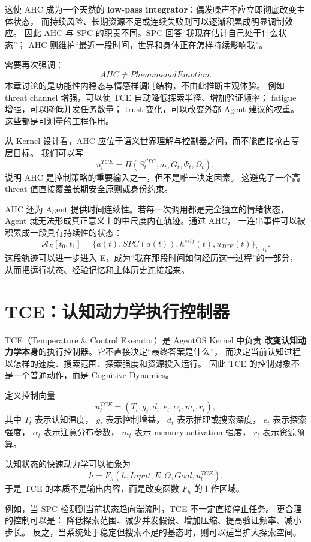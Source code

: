 这使 AHC 成为一个天然的
\textbf{low-pass integrator}：偶发噪声不应立即彻底改变主体状态，
而持续风险、长期资源不足或连续失败则可以逐渐积累成明显调制效应。
因此 AHC 与 SPC 的职责不同。SPC 回答``我现在估计自己处于什么状态''；
AHC 则维护``最近一段时间，世界和身体正在怎样持续影响我''。

需要再次强调：
\[
\boxed{
AHC\neq PhenomenalEmotion.
}
\]
本章讨论的是功能性内稳态与情感样调制结构，不由此推断主观体验。
例如 threat channel 增强，可以使 TCE 自动降低探索半径、增加验证频率；
fatigue 增强，可以降低并发任务数量；
trust 变化，可以改变外部 Agent 建议的权重。
这些都是可测量的工程作用。

从 Kernel 设计看，AHC 应位于语义世界理解与控制器之间，而不能直接抢占高层目标。
我们可以写
\[
u_t^{TCE}
=
\Pi(
S_t^{SPC},
a_t,
G_t,
\Psi_t,
\Omega_t
),
\]
说明 AHC 是控制策略的重要输入之一，但不是唯一决定因素。
这避免了一个高 threat 值直接覆盖长期安全原则或身份约束。

AHC 还为 Agent 提供时间连续性。若每一次调用都是完全独立的情绪状态，
Agent 就无法形成真正意义上的中尺度内在轨迹。通过 AHC，
一连串事件可以被积累成一段具有持续性的状态：
\[
\mathcal A_E[t_0,t_1]
=
\{a(t),SPC(a(t)),h^{self}(t),u_{TCE}(t)\}_{t_0:t_1}.
\]
这段轨迹可以进一步进入 E，成为``我在那段时间如何经历这一过程''的一部分，
从而把运行状态、经验记忆和主体历史连接起来。


\section{TCE：认知动力学执行控制器}

TCE（Temperature \& Control Executor）是 AgentOS Kernel 中负责
\textbf{改变认知动力学本身}的执行控制器。它不直接决定``最终答案是什么''，
而决定当前认知过程以怎样的速度、搜索范围、探索强度和资源投入运行。
因此 TCE 的控制对象不是一个普通动作，而是 Cognitive Dynamics。

定义控制向量
\[
u_t^{TCE}
=
(
T_t,
g_t,
d_t,
e_t,
\alpha_t,
m_t,
r_t
),
\]
其中 $T_t$ 表示认知温度，
$g_t$ 表示控制增益，
$d_t$ 表示推理或搜索深度，
$e_t$ 表示探索强度，
$\alpha_t$ 表示注意分布参数，
$m_t$ 表示 memory activation 强度，
$r_t$ 表示资源预算。

认知状态的快速动力学可以抽象为
\[
\dot h
=
F_h(
h,
Input,
E,
\Theta,
Goal,
u_t^{TCE}
).
\]
于是 TCE 的本质不是输出内容，而是改变函数 $F_h$ 的工作区域。

例如，当 SPC 检测到当前状态趋向湍流时，TCE 不一定直接停止任务。
更合理的控制可以是：
降低探索范围、减少并发假设、增加压缩、提高验证频率、减小步长。
反之，当系统处于稳定但搜索不足的基态时，则可以适当扩大探索空间。

